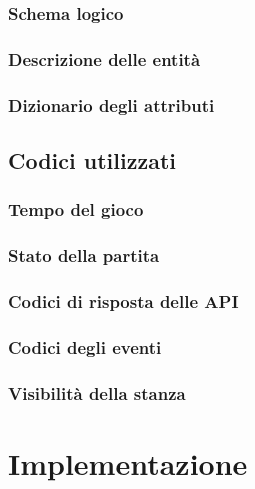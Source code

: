 \documentclass[10pt,twoside,cucitura]{toptesi}
\begin{document}
\subsection{Schema logico}


\subsection{Descrizione delle entità}


\subsection{Dizionario degli attributi}


\section{Codici utilizzati}


\subsection{Tempo del gioco}


\subsection{Stato della partita}


\subsection{Codici di risposta delle API}


\subsection{Codici degli eventi}


\subsection{Visibilità della stanza}


\chapter{Implementazione}
\end{document}
